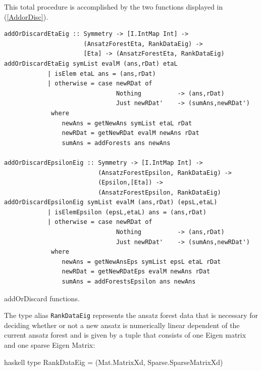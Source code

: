 \documentclass[a4paper,12pt, DIV=14, BCOR=5mm, twoside, headsepline, numbers=noenddot]{scrbook}
\begin{document}
This total procedure is accomplished by the two functions displayed in (\ref{AddorDisc}).

\begin{listing}[hbt!]
\begin{verbatim}
addOrDiscardEtaEig :: Symmetry -> [I.IntMap Int] ->
                      (AnsatzForestEta, RankDataEig) -> 
                      [Eta] -> (AnsatzForestEta, RankDataEig)
addOrDiscardEtaEig symList evalM (ans,rDat) etaL
            | isElem etaL ans = (ans,rDat)
            | otherwise = case newRDat of
                               Nothing          -> (ans,rDat)
                               Just newRDat'    -> (sumAns,newRDat')
             where
                newAns = getNewAns symList etaL rDat
                newRDat = getNewRDat evalM newAns rDat
                sumAns = addForests ans newAns

addOrDiscardEpsilonEig :: Symmetry -> [I.IntMap Int] ->
                          (AnsatzForestEpsilon, RankDataEig) ->
                          (Epsilon,[Eta]) ->
                          (AnsatzForestEpsilon, RankDataEig)
addOrDiscardEpsilonEig symList evalM (ans,rDat) (epsL,etaL)
            | isElemEpsilon (epsL,etaL) ans = (ans,rDat)
            | otherwise = case newRDat of
                               Nothing          -> (ans,rDat)
                               Just newRDat'    -> (sumAns,newRDat')
             where
                newAns = getNewAnsEps symList epsL etaL rDat
                newRDat = getNewRDatEps evalM newAns rDat
                sumAns = addForestsEpsilon ans newAns
\end{verbatim} 
\caption{addOrDiscard functions.}\label{AddorDisc}
\end{listing}

The type alias \texttt{RankDataEig} represents the ansatz forest data that is necessary for deciding whether or not a new ansatz is numerically linear dependent of the current ansatz forest and is given by a tuple that consists of one Eigen matrix and one sparse Eigen Matrix:

\begin{center}
\begin{cminted}{haskell}
type RankDataEig = (Mat.MatrixXd, Sparse.SparseMatrixXd)
\end{cminted}
\end{center}
\end{document}
